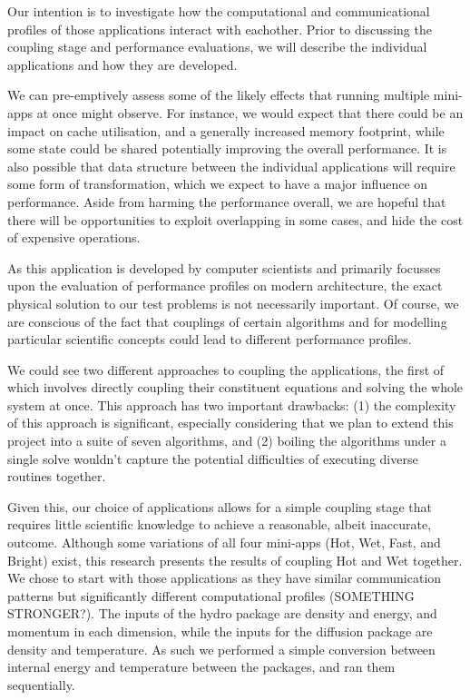 \documentclass[runningheads,a4paper]{llncs}
\begin{document}
Our intention is to investigate how the computational and communicational profiles of those applications interact with eachother. Prior to discussing the coupling stage and performance evaluations, we will describe the individual applications and how they are developed.

We can pre-emptively assess some of the likely effects that running multiple mini-apps at once might observe. For instance, we would expect that there could be an impact on cache utilisation, and a generally increased memory footprint, while some state could be shared potentially improving the overall performance. It is also possible that data structure between the individual applications will require some form of transformation, which we expect to have a major influence on performance. Aside from harming the performance overall, we are hopeful that there will be opportunities to exploit overlapping in some cases, and hide the cost of expensive operations.

As this application is developed by computer scientists and primarily focusses upon the evaluation of performance profiles on modern architecture, the exact physical solution to our test problems is not necessarily important. Of course, we are conscious of the fact that couplings of certain algorithms and for modelling particular scientific concepts could lead to different performance profiles.

We could see two different approaches to coupling the applications, the first of which involves directly coupling their constituent equations and solving the whole system at once. This approach has two important drawbacks: (1) the complexity of this approach is significant, especially considering that we plan to extend this project into a suite of seven algorithms, and (2) boiling the algorithms under a single solve wouldn't capture the potential difficulties of executing diverse routines together.

Given this, our choice of applications allows for a simple coupling stage that requires little scientific knowledge to achieve a reasonable, albeit inaccurate, outcome. Although some variations of all four mini-apps (Hot, Wet, Fast, and Bright) exist, this research presents the results of coupling Hot and Wet together. We chose to start with those applications as they have similar communication patterns but significantly different computational profiles (SOMETHING STRONGER?). The inputs of the hydro package are density and energy, and momentum in each dimension, while the inputs for the diffusion package are density and temperature. As such we performed a simple conversion between internal energy and temperature between the packages, and ran them sequentially.
\end{document}
